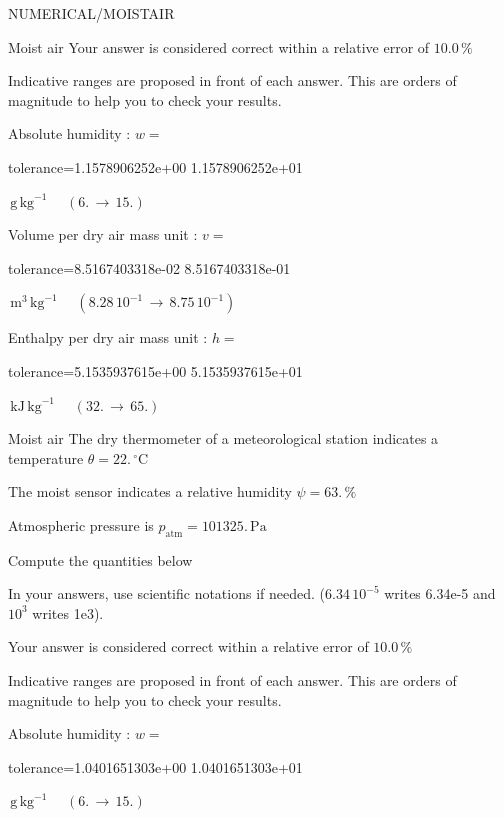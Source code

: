 \documentclass[12pt]{article}
\begin{document}
\begin{quiz}{NUMERICAL/MOISTAIR}
\begin{cloze}{Moist air}
Your answer is considered correct within a relative error of $10.0\, \% $

Indicative ranges are proposed in front of each answer. This are orders of magnitude to help you to check your results.

Absolute humidity : $w =  $
\begin{numerical}[points=1] 
\item[tolerance={1.1578906252e+00}] 1.1578906252e+01 
\end{numerical} 
 $\,  \mathrm{g}\,  \mathrm{kg}^{-1}$ 
 $ \quad (6. \, \rightarrow \, 15.) $ 

Volume per dry air mass unit : $v =  $
\begin{numerical}[points=1] 
\item[tolerance={8.5167403318e-02}] 8.5167403318e-01 
\end{numerical} 
 $\,  \mathrm{m}^{3}\,  \mathrm{kg}^{-1}$ 
 $ \quad ( 8.28 \, 10^{-1}  \, \rightarrow \,  8.75 \, 10^{-1} ) $ 

Enthalpy per dry air mass unit : $h =  $
\begin{numerical}[points=2] 
\item[tolerance={5.1535937615e+00}] 5.1535937615e+01 
\end{numerical} 
 $\,  \mathrm{kJ}\,  \mathrm{kg}^{-1}$ 
 $ \quad (32. \, \rightarrow \, 65.) $ 

\end{cloze} 


 \begin{cloze}{Moist air} 
The dry thermometer of a meteorological station indicates a temperature $\theta = 22.\,  \mathrm{^\circ\mathrm{C}} $

The moist sensor indicates a relative humidity $\psi = 63.\, \% $

Atmospheric pressure is $p_{\text{atm}} = 101325.\,  \mathrm{Pa} $

 

Compute the quantities below

In your answers, use scientific notations if needed.  ($6.34\, 10^{-5}$ writes 6.34e-5 and $10^{3}$ writes 1e3).

Your answer is considered correct within a relative error of $10.0\, \% $

Indicative ranges are proposed in front of each answer. This are orders of magnitude to help you to check your results.

Absolute humidity : $w =  $
\begin{numerical}[points=1] 
\item[tolerance={1.0401651303e+00}] 1.0401651303e+01 
\end{numerical} 
 $\,  \mathrm{g}\,  \mathrm{kg}^{-1}$ 
 $ \quad (6. \, \rightarrow \, 15.) $ 


\end{cloze}
\end{quiz}
\end{document}

